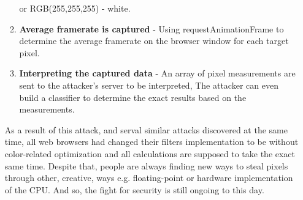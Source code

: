 \begin{itemize}
\begin{enumerate}
        or RGB(255,255,255) - white.
        \item \textbf{Average framerate is captured} - Using requestAnimationFrame \cite{requestAnimationFrame} to determine the average framerate on the
        browser window for each target pixel.
        \item \textbf{Interpreting the captured data} - An array of pixel measurements are sent to the attacker’s server to be interpreted, The attacker can
        even build a classifier to determine the  exact results based on the measurements.
    \end{enumerate}
    As a result of this attack, and serval similar attacks \cite{stone2013pixel} \cite{andrysco2015subnormal} discovered at the same time, all web browsers had changed their filters implementation to be
    without color-related optimization and all calculations are supposed to take the exact same time. Despite that, people are always finding new ways
    to steal pixels through other, creative, ways e.g. floating-point or hardware implementation of the CPU. And so, the fight for security is still ongoing to this day.

\end{itemize}
